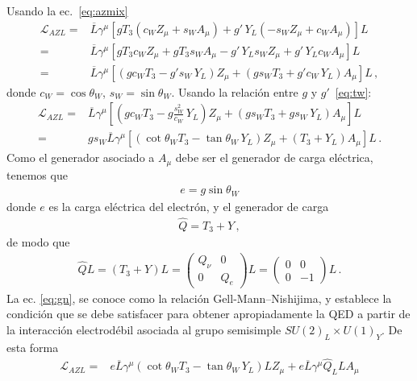 \begin{frame}
Usando la ec.~\eqref{eq:azmix}
\begin{align}
   \mathcal{L}_{A Z L}=&\overline{L}\gamma^\mu\left[g T_3(c_W Z_\mu+s_W A_\mu)+g'\,Y_L(-s_W Z_\mu+c_W A_\mu)\right]L\nonumber\\
     =&\overline{L}\gamma^\mu\left[g T_3c_W Z_\mu+g T_3s_W A_\mu-g'\,Y_Ls_W Z_\mu+g'\,Y_Lc_W A_\mu\right]L\nonumber\\
    =&\overline{L}\gamma^\mu\left[\left(g c_WT_3-g's_W\,Y_L\right)Z_\mu
       +\left(g s_W T_3+g'c_W\,Y_L\right) A_\mu\right]L\,,
\end{align}
donde $c_W=\cos\theta_W$, $s_W=\sin\theta_W$. Usando la relación entre $g$ y $g'$~\eqref{eq:tw}:
\begin{align}
    \mathcal{L}_{A Z L}=&\overline{L}\gamma^\mu\left[\left(g c_WT_3-g \frac{s_W^2}{c_W}\,Y_L\right)Z_\mu
       +\left(g s_W T_3+g s_W\,Y_L\right) A_\mu\right]L\nonumber\\
=&g s_W\overline{L}\gamma^\mu\left[\left(\cot\theta_WT_3- \tan\theta_W\,Y_L\right)Z_\mu
       +\left(T_3+Y_L\right) A_\mu\right]L\,.
\end{align}
Como el generador asociado a $A_\mu$ debe ser el generador de carga eléctrica, tenemos que
\begin{align}
  e=g\sin\theta_W
\end{align}
donde $e$ es la carga eléctrica del electrón, y el generador de carga
\begin{align}
\label{eq:gn}
  \widehat{Q}=T_3+Y\,,
\end{align}
de modo que
\begin{align}
  \widehat{Q}L=(T_3+Y)L=
  \begin{pmatrix}
    Q_\nu & 0\\
    0  & Q_e
  \end{pmatrix}L=  \begin{pmatrix}
    0 & 0\\
    0  & -1
  \end{pmatrix}L
\,.
\end{align}
La ec. \eqref{eq:gn}, se conoce como la relación Gell-Mann--Nishijima, y establece la condición que se debe satisfacer para obtener apropiadamente la QED a partir de la interacción electrodébil asociada al grupo semisimple $SU(2)_L\times  U(1)_Y$.
De esta forma
\begin{align}
    \mathcal{L}_{A Z L}
=&e\overline{L}\gamma^\mu\left(\cot\theta_W T_3-\tan\theta_W\,Y_L\right)L Z_\mu
       +e\overline{L}\gamma^\mu \widehat{Q}_L L A_\mu\nonumber\\

\end{align}
\end{frame}
